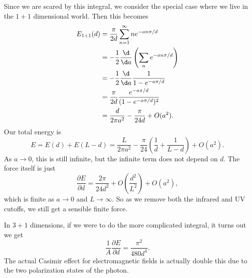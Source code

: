\documentclass[a4paper]{article}
\begin{document}
Since we are scared by this integral, we consider the special case where we live in the $1 + 1$ dimensional world. Then this becomes
\begin{align*}
  E_{1 + 1}(d) &= \frac{\pi}{2d} \sum_{n = 1}^\infty n e^{-an\pi/d} \\
  &= -\frac{1}{2} \frac{\d}{\d a}\left(\sum_n e^{-an\pi/d}\right)\\
  &= -\frac{1}{2} \frac{\d}{\d a} \frac{1}{1 - e^{-a\pi/d}}\\
  &= \frac{\pi}{2d}\frac{e^{-a\pi/d}}{(1 - e^{-a\pi/d})^2}\\
  &= \frac{d}{2\pi a^2} - \frac{\pi}{24 d} + O(a^2).
\end{align*}
Our total energy is
\[
  E = E(d) + E(L - d) = \frac{L}{2\pi a^2} - \frac{\pi}{24}\left(\frac{1}{d} + \frac{1}{L - d}\right) + O(a^2).
\]
As $a \to 0$, this is still infinite, but the infinite term does not depend on $d$. The force itself is just
\[
  \frac{\partial E}{\partial d} = \frac{2\pi}{24 d^2} + O\left(\frac{d^2}{L^2}\right) + O(a^2),
\]
which is finite as $a \to 0$ and $L \to \infty$. So as we remove both the infrared and UV cutoffs, we still get a sensible finite force.

In $3 + 1$ dimensions, if we were to do the more complicated integral, it turns out we get
\[
  \frac{1}{A}\frac{\partial E}{\partial d} = \frac{\pi^2}{480 d^4}.
\]
The actual Casimir effect for electromagnetic fields is actually double this due to the two polarization states of the photon.
\end{document}
